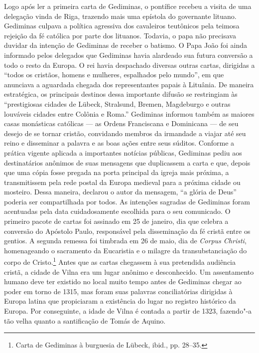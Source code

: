 Logo após ler a primeira carta de Gediminas, o pontífice recebeu a
visita de uma delegação vinda de Riga, trazendo mais uma epístola do
governante lituano. Gediminas culpava a política agressiva dos
cavaleiros teutônicos pela teimosa rejeição da fé católica por parte dos
lituanos. Todavia, o papa não precisava duvidar da intenção de Gediminas
de receber o batismo. O Papa João  foi ainda informado pelos
delegados que Gediminas havia alardeado sua futura conversão a todo o
resto da Europa. O rei havia despachado diversas outras cartas,
dirigidas a ``todos os cristãos, homens e mulheres, espalhados pelo
mundo'', em que anunciava a aguardada chegada dos representantes papais
à Lituânia. De maneira estratégica, os principais destinos dessa
importante difusão se restringiam às ``prestigiosas cidades de Lübeck,
Stralsund, Bremen, Magdeburgo e outras louváveis cidades entre Colônia e
Roma.'' Gediminas informou também as maiores casas monásticas católicas
--- as Ordens Franciscana e Dominicana --- de seu desejo de se tornar
cristão, convidando membros da irmandade a viajar até seu reino e
disseminar a palavra e as boas ações entre seus súditos. Conforme a
prática vigente aplicada a importantes notícias públicas, Gediminas
pediu aos destinatários anônimos de suas mensagens que duplicassem a
carta e que, depois que uma cópia fosse pregada na porta principal da
igreja mais próxima, a transmitissem pela rede postal da Europa medieval
para a próxima cidade ou mosteiro. Dessa maneira, declarou o autor da
mensagem, ``a glória de Deus'' poderia ser compartilhada por todos. As
intenções sagradas de Gediminas foram acentuadas pela data
cuidadosamente escolhida para o seu comunicado. O primeiro pacote de
cartas foi assinado em 25 de janeiro, dia que celebra a conversão do
Apóstolo Paulo, responsável pela disseminação da fé cristã entre os
gentios. A segunda remessa foi timbrada em 26 de maio, dia de
\textit{Corpus Christi}, homenageando o sacramento da Eucaristia e o
milagre da transubstanciação do corpo de Cristo.\footnote{Carta de Gediminas à burguesia de Lübeck, ibid., pp. 28--35.}
Antes que as cartas chegassem à sua pretendida audiência cristã, a
cidade de Vilna era um lugar anônimo e desconhecido. Um assentamento
humano deve ter existido no local muito tempo antes de Gediminas chegar
ao poder em torno de 1315, mas foram suas palavras conciliatórias
dirigidas à Europa latina que propiciaram a existência do lugar no
registro histórico da Europa. Por conseguinte, a idade de Vilna é
contada a partir de 1323, fazendo"-a tão velha quanto a santificação de
Tomás de Aquino.

